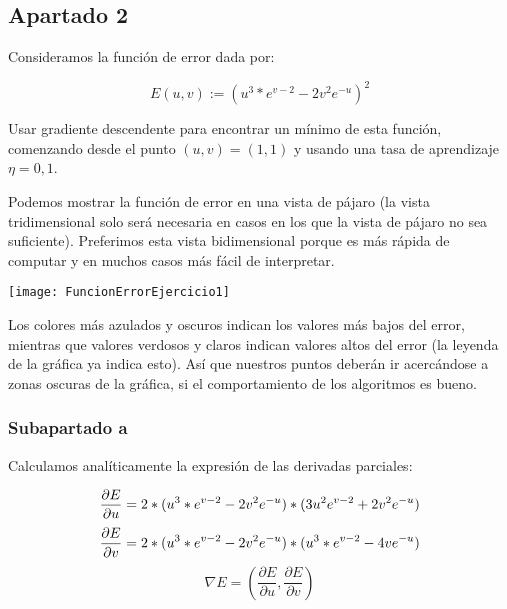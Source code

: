 \documentclass[11pt]{article}
\begin{document}
\pagebreak

\subsection{Apartado 2}
\label{seccion:Apartado2}

Consideramos la función de error dada por:

\begin{displaymath}
    E(u, v) := (u^3 * e^{v-2} - 2v^2 e^{-u})^2
\end{displaymath}

Usar gradiente descendente para encontrar un mínimo de esta función, comenzando desde el punto $(u, v) = (1, 1)$ y
usando una tasa de aprendizaje $\eta = 0,1$.

Podemos mostrar la función de error en una vista de pájaro (la vista tridimensional solo será necesaria en casos en los que la vista de pájaro no sea suficiente). Preferimos esta vista bidimensional porque es más rápida de computar y en muchos casos más fácil de interpretar.

\texttt{[image: FuncionErrorEjercicio1]}

Los colores más azulados y oscuros indican los valores más bajos del error, mientras que valores verdosos y claros indican valores altos del error (la leyenda de la gráfica ya indica esto). Así que nuestros puntos deberán ir acercándose a zonas oscuras de la gráfica, si el comportamiento de los algoritmos es bueno.


\subsubsection{Subapartado a}

Calculamos analíticamente la expresión de las derivadas parciales:

\begin{displaymath}
    \frac{\partial E}{\partial u} = 2 * (u^3 * e^{v-2} - 2v^2 e^{-u}) * (3u^2 e^{v-2} + 2v^2 e^{-u}) \\
\end{displaymath}
\begin{displaymath}
    \frac{\partial E}{\partial v} = 2 * (u^3 * e^{v-2} - 2v^2 e^{-u}) * (u^3 * e^{v-2} - 4v e^{-u})  \\
\end{displaymath}
\begin{displaymath}
    \nabla E = (\frac{\partial E}{\partial u}, \frac{\partial E}{\partial v})
\end{displaymath}
\end{document}
